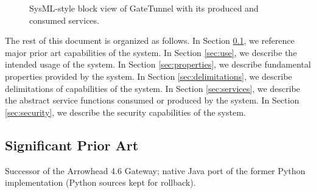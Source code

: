\documentclass[a4paper]{arrowhead}
\begin{document}
\begin{figure}[ht!]
  \centering
  \caption{SysML-style block view of GateTunnel with its produced and consumed services.}
  \label{fig:system}
\end{figure}

The rest of this document is organized as follows.
In Section \ref{sec:prior_art}, we reference major prior art capabilities of the system.
In Section \ref{sec:use}, we describe the intended usage of the system.
In Section \ref{sec:properties}, we describe fundamental properties provided by the system.
In Section \ref{sec:delimitations}, we describe delimitations of capabilities of the system.
In Section \ref{sec:services}, we describe the abstract service functions consumed or produced by the system.
In Section \ref{sec:security}, we describe the security capabilities of the system.

\newpage

\subsection{Significant Prior Art}
\label{sec:prior_art}

Successor of the Arrowhead 4.6 Gateway; native Java port of the former Python implementation (Python sources kept for rollback).
\end{document}
